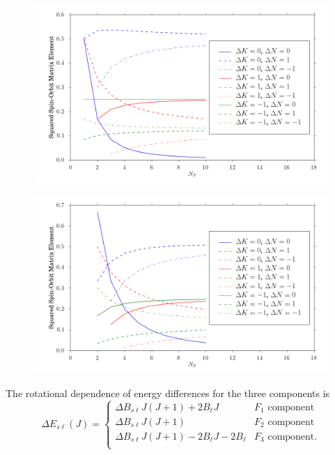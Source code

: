 \documentclass[12pt,draft]{mitthesis}
\begin{document}
\begin{figure}
  \caption{}
  \label{fig:rotational-factors-1}
  \centering
  \includegraphics[width=6in]{rotational_factors_k1.png}
\end{figure}

\begin{figure}
  \caption{}
  \label{fig:rotational-factors-2}
  \centering
  \includegraphics[width=6in]{rotational_factors_k2.png}
\end{figure}

The rotational dependence of energy differences for the three
components is
\begin{equation}
  \Delta E_{s\ell}(J) = 
  \begin{cases}
    \Delta B_{s\ell}J(J+1) + 2B_{\ell}J           
    & F_1 \text{ component}\\
    \Delta B_{s\ell}J(J+1)                      
    & F_2 \text{ component}\\
    \Delta B_{s\ell}J(J+1) - 2B_{\ell}J - 2B_{\ell} 
    & F_3 \text{ component}.\\
  \end{cases}
\end{equation}
\end{document}
